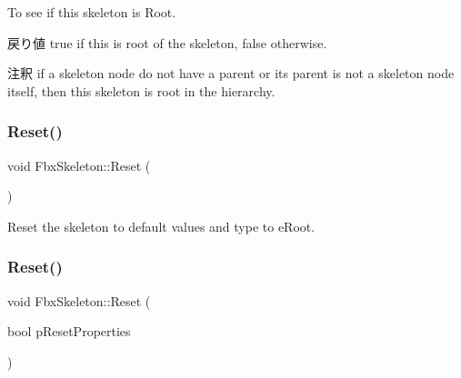 To see if this skeleton is Root. \begin{DoxyReturn}{戻り値}
{\ttfamily true} if this is root of the skeleton, {\ttfamily false} otherwise. 
\end{DoxyReturn}
\begin{DoxyRemark}{注釈}
if a skeleton node do not have a parent or its parent is not a skeleton node itself, then this skeleton is root in the hierarchy. 
\end{DoxyRemark}
\mbox{\label{class_fbx_skeleton_a622069fcb67d773d755e96b321df1094}} 
\subsubsection{\texorpdfstring{Reset()}{Reset()}\hspace{0.1cm}{\footnotesize\ttfamily [1/2]}}
{\footnotesize\ttfamily void Fbx\+Skeleton\+::\+Reset (\begin{DoxyParamCaption}{ }\end{DoxyParamCaption})}



Reset the skeleton to default values and type to {\ttfamily e\+Root}. 

\mbox{\label{class_fbx_skeleton_a1ffc5d46440a35d2ddfa75f20918c1b4}} 
\subsubsection{\texorpdfstring{Reset()}{Reset()}\hspace{0.1cm}{\footnotesize\ttfamily [2/2]}}
{\footnotesize\ttfamily void Fbx\+Skeleton\+::\+Reset (\begin{DoxyParamCaption}\item[{bool}]{p\+Reset\+Properties }\end{DoxyParamCaption})\hspace{0.3cm}{\ttfamily [protected]}}

\mbox{\label{class_fbx_skeleton_a19297c7b85e06e47c34e2a97964d7de8}} 

